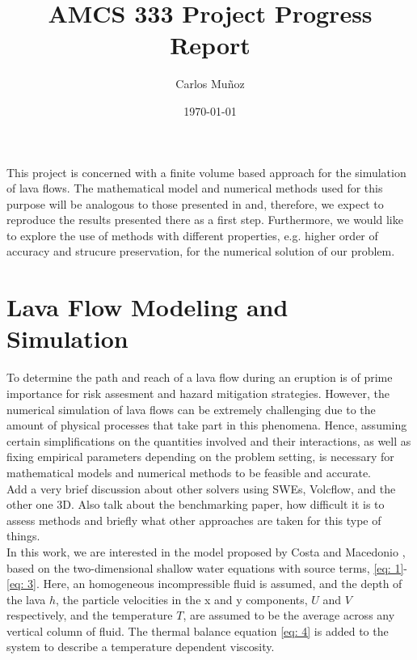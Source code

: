 \documentclass[12pt]{article}
\title{AMCS 333 Project Progress Report}
\author{Carlos Muñoz}
\date{\today}
\begin{document}
\maketitle

This project is concerned with a finite volume based approach for the simulation of lava flows. 
The mathematical model and numerical methods used for this purpose  will be analogous to those presented in \cite{costa2005numerical} and, therefore, we expect to reproduce the results presented there as a first step. 
Furthermore, we would like to explore the use of methods with different properties, e.g. higher order of accuracy and strucure preservation, for the numerical solution of our problem.

\section{Lava Flow Modeling and Simulation}

To determine the path and reach of a lava flow during an eruption is of prime importance for risk assesment and hazard mitigation strategies.
However, the numerical simulation of lava flows can be extremely challenging due to the amount of physical processes that take part in this phenomena.
Hence, assuming certain simplifications on the quantities involved and their interactions, as well as fixing empirical parameters depending on the problem setting,  is necessary for  mathematical models and numerical methods to be feasible and accurate.\\

{\color{red}Add a very brief discussion about other solvers using SWEs, Volcflow, and the other one 3D. Also talk about the benchmarking paper, how difficult it is to assess methods and briefly what other approaches are taken for this type of things.}\\

In this work, we are interested in the model proposed by Costa and Macedonio \cite{costa2005numerical}, based on the two-dimensional shallow water equations with source terms, \eqref{eq: 1}-\eqref{eq: 3}.
Here, an homogeneous incompressible fluid is assumed, and the depth of the lava $h$, the particle velocities in the x and y components, $U$ and $V$ respectively, and the temperature $T$, are assumed to be the average across any vertical column of fluid. 
The thermal balance equation \eqref{eq: 4} is added to the system to describe a temperature dependent viscosity.
\end{document}
